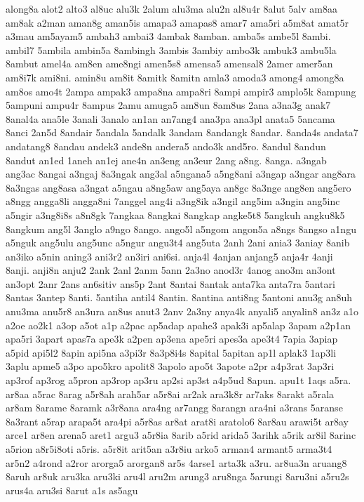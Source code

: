 {along8a alot2 alto3 al8uc alu3k 2alum alu3ma alu2n al8u4r 8alut 5alv am8aa
am8ak a2man aman8g aman5is amapa3 amapas8 amar7 ama5ri a5m8at amat5r a3mau
am5ayam5 ambah3 ambai3 4ambak 8amban. amba5s ambe5l 8ambi. ambil7 5ambila
ambin5a 8ambingh 3ambis 3ambiy ambo3k ambuk3 ambu5la 8ambut amel4a am8en
ame8ngi amen5s8 amensa5 amensal8 2amer amer5an am8i7k ami8ni. amin8u am8it
8amitk 8amitn amla3 amoda3 among4 among8a am8os amo4t 2ampa ampak3 ampa8na
ampa8ri 8ampi ampir3 amplo5k 8ampung 5ampuni ampu4r 8ampus 2amu amuga5
am8un 8am8us 2ana a3na3g anak7 8anal4a ana5le 3anali 3analo an1an an7ang4
ana3pa ana3pl anata5 5ancama 8anci 2an5d 8andair 5andala 5andalk 3andam
8andangk 8andar. 8anda4s andata7 andatang8 8andau andek3 ande8n andera5
ando3k and5ro. 8andul 8andun 8andut an1ed 1aneh an1ej ane4n an3eng an3eur
2ang a8ng. 8anga. a3ngab ang3ac 8angai a3ngaj 8a3ngak ang3al a5ngana5
a5ng8ani a3ngap a3ngar ang8ara 8a3ngas ang8asa a3ngat a5ngau a8ng5aw
ang5aya an8gc 8a3nge ang8en ang5ero a8ngg angga8li angga8ni 7anggel ang4i
a3ng8ik a3ngil ang5im a3ngin ang5inc a5ngir a3ng8i8s a8n8gk 7angkaa
8angkai 8angkap angke5t8 5angkuh angku8k5 8angkum ang5l 3anglo a9ngo
8ango. ango5l a5ngom angon5a a8ngs 8angso a1ngu a5nguk ang5ulu ang5unc
a5ngur angu3t4 ang5uta 2anh 2ani ania3 3aniay 8anib an3iko a5nin aning3
ani3r2 an3iri ani6si. anja4l 4anjan anjang5 anja4r 4anji 8anji. anji8n
anju2 2ank 2anl 2anm 5ann 2a3no anod3r 4anog ano3m an3ont an3opt 2anr 2ans
an6sitiv ans5p 2ant 8antai 8antak anta7ka anta7ra 5antari 8antas 3antep
8anti. 5antiha antil4 8antin. 8antina anti8ng 5antoni anu3g an8uh anu3ma
anu5r8 an3ura an8us anut3 2anv 2a3ny anya4k anyali5 anyalin8 an3z a1o a2oe
ao2k1 a3op a5ot a1p a2pac ap5adap apahe3 apak3i ap5alap 3apam a2p1an
apa5ri 3apart apas7a ape3k a2pen ap3ena ape5ri apes3a ape3t4 7apia 3apiap
a5pid api5l2 8apin api5na a3pi3r 8a3p8i4s 8apital 5apitan ap1l aplak3
1ap3li 3aplu apme5 a3po apo5kro apolit8 3apolo apo5t 3apote a2pr a4p3rat
3ap3ri ap3rof ap3rog a5pron ap3rop ap3ru ap2si ap3st a4p5ud 8apun. apu1t
1aqs a5ra. ar8aa a5rac 8arag a5r8ah arah5ar a5r8ai ar2ak ara3k8r ar7aks
8arakt a5rala ar8am 8arame 8aramk a3r8ana ara4ng ar7angg 8arangn ara4ni
a3rans 5aranse 8a3rant a5rap arapa5t ara4pi a5r8as ar8at arat8i aratolo6
8ar8au arawi5t ar8ay arce1 ar8en arena5 aret1 argu3 a5r8ia 8arib a5rid
arida5 3arihk a5rik ar8il 8arinc a5rion a8r5i8oti a5ris. a5r8it arit5an
a3r8iu arko5 arman4 armant5 arma3t4 ar5n2 a4rond a2ror arorga5 arorgan8
ar5s 4arse1 arta3k a3ru. ar8ua3n aruang8 8aruh ar8uk aru3ka aru3ki aru4l
aru2m arung3 aru8nga 5arungi 8aru3ni a5ru2s arus4a aru3si 8arut a1s as5agu
}
